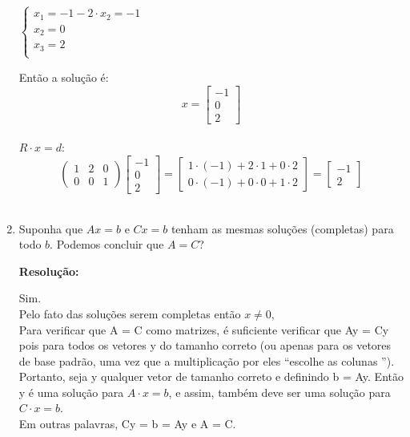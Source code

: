 \documentclass[leqno]{article}
\numberwithin{equation}{section}
\newenvironment{sol}
{
	\vspace{4mm}
	\noindent\textbf{Resolução:}
	\strut\newline
	\smallskip
	\hspace{-3.5mm}
}
{}
\begin{document}
\begin{enumerate}
		$
		\left\{
		\begin {array}{cl}
		x_1 = -1 - 2 \cdot x_2 = -1\\
		x_2 = 0\\
		x_3 = 2\\
		\end{array}
		\right.$\\
		\vspace{0.2cm}
		
		Então a solução é:\\
		$$x= \begin{bmatrix} 
			-1 \\
			0 \\
			2 \end{bmatrix}$$\\
		
		$R \cdot x = d$:\\
		$$\begin{pmatrix}
			1 & 2 & 0 \\
			0 & 0 & 1  
		\end{pmatrix}
		\begin{bmatrix} 
			-1 \\
			0 \\
			2 \end{bmatrix} = 
		\begin{bmatrix} 
			1 \cdot (-1) + 2 \cdot 1 + 0 \cdot 2 \\
			0 \cdot (-1) + 0 \cdot 0 + 1 \cdot 2 \end{bmatrix} =
		\begin{bmatrix} 
			-1\\
			2\end{bmatrix}$$\\
		
		
		\item Suponha que $Ax = b$ e $Cx = b$ tenham as mesmas soluções (completas) para todo $b$. Podemos concluir que $A = C$?
		
		\begin{sol} 
			Sim.\\
			\vspace{0.2cm}
			Pelo fato das soluções serem completas então $x \neq 0$,\\
			\vspace{0.2cm}
			Para verificar que A = C como matrizes, é suficiente verificar que Ay = Cy pois para todos os vetores y do tamanho correto (ou apenas para os vetores de base padrão, uma vez que a multiplicação por eles “escolhe as colunas ”).\\
			\vspace{0.2cm}
			Portanto, seja y qualquer vetor de tamanho correto e definindo b = Ay. Então y é uma solução para $A \cdot x = b$, e assim, também deve ser uma solução para $C \cdot x = b$.\\
			\vspace{0.2cm}
			Em outras palavras, Cy = b = Ay e A = C.
		\end{sol} 
		

\end{enumerate}
\end{document}
